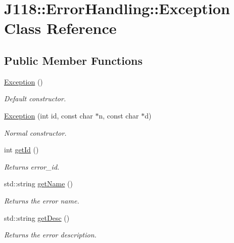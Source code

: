 \hypertarget{class_j118_1_1_error_handling_1_1_exception}{}\section{J118\+:\+:Error\+Handling\+:\+:Exception Class Reference}
\label{class_j118_1_1_error_handling_1_1_exception}
\subsection*{Public Member Functions}
\begin{DoxyCompactItemize}
\item 
\hypertarget{class_j118_1_1_error_handling_1_1_exception_ad198efcdbab0bfcc391be37faa902b7c}{}\hyperlink{class_j118_1_1_error_handling_1_1_exception_ad198efcdbab0bfcc391be37faa902b7c}{Exception} ()\label{class_j118_1_1_error_handling_1_1_exception_ad198efcdbab0bfcc391be37faa902b7c}

\begin{DoxyCompactList}\small\item\em Default constructor. \end{DoxyCompactList}\item 
\hyperlink{class_j118_1_1_error_handling_1_1_exception_aa42811d0c39c889bd1b2c4f0b290e3bb}{Exception} (int id, const char $\ast$n, const char $\ast$d)
\begin{DoxyCompactList}\small\item\em Normal constructor. \end{DoxyCompactList}\item 
int \hyperlink{class_j118_1_1_error_handling_1_1_exception_a23cb87bd08a68063b4631fcb0a0ce813}{get\+Id} ()
\begin{DoxyCompactList}\small\item\em Returns error\+\_\+id. \end{DoxyCompactList}\item 
std\+::string \hyperlink{class_j118_1_1_error_handling_1_1_exception_ad60486b9b68b001eb8141a951da92b46}{get\+Name} ()
\begin{DoxyCompactList}\small\item\em Returns the error name. \end{DoxyCompactList}\item 
std\+::string \hyperlink{class_j118_1_1_error_handling_1_1_exception_a94983c1a3e04e1d2fd3a9db88eadd836}{get\+Desc} ()
\begin{DoxyCompactList}\small\item\em Returns the error description. \end{DoxyCompactList}\end{DoxyCompactItemize}
